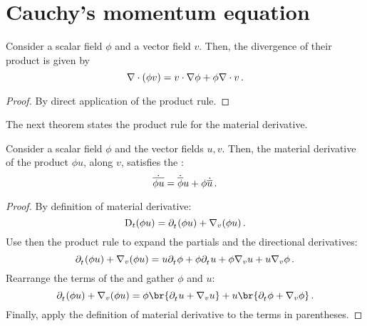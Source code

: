 \section{Cauchy's momentum equation}
\label{sec:cauchy-momentum-equation}

\begin{theorem}
  Consider a scalar field $\phi$ and a vector field $v$. Then, the divergence of their product is given by
  \begin{equation}\label{eqn:divergence-scalar-vector-product}
    \odiv\vat{\phi v} = v\iprod\ograd\phi + \phi\odiv v\,.
  \end{equation}
\end{theorem}
%
\begin{proof}
  By direct application of the product rule.
\end{proof}

The next theorem states the product rule for the material derivative.
%
\begin{theorem}
  Consider a scalar field $\phi$ and the vector fields $u,v$. Then, the material derivative of the product $\phi u$, along $v$, satisfies the :
  \begin{equation}\label{eqn:product-rule-material-derivative}
    \dot{\overline{\phi u}} = \dot{\overline{\phi}} u + \phi\dot{\overline{u}}\,.
  \end{equation}
\end{theorem}
%
\begin{proof}
  By definition of material derivative:
  \begin{equation*}
    \omdt t\vat{\phi u} = \cpd t\vat{\phi u} + \ocder v\vat{\phi u}\,.
  \end{equation*}
  Use then the product rule to expand the partials and the directional derivatives:
  \begin{equation*}
    \cpd t\vat{\phi u} + \ocder v\vat{\phi u}
    =
    u\cpd t\phi + \phi\cpd tu + \phi\ocder vu + u\ocder v\phi\,.
  \end{equation*}
  Rearrange the terms of the  and gather $\phi$ and $u$:
  \begin{equation*}
    \cpd t\vat{\phi u} + \ocder v\vat{\phi u}
    =
    \phi\br{\cpd tu + \ocder vu} + u\br{\cpd t\phi + \ocder v\phi}\,.
  \end{equation*}
  Finally, apply the definition of material derivative to the terms in parentheses.
\end{proof}


